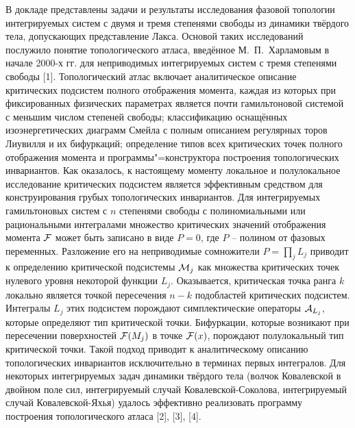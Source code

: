 \vzmscaption


В докладе представлены задачи и результаты исследования фазовой топологии интегрируемых систем с двумя и тремя степенями свободы из динамики твёрдого тела, допускающих представление Лакса. Основой таких исследований послужило понятие топологического атласа, введённое М.~П.~Харламовым в начале 2000-х гг. для неприводимых интегрируемых систем с тремя степенями свободы [1]. Топологический атлас включает аналитическое описание критических подсистем полного отображения момента, каждая из которых при фиксированных физических параметрах является почти гамильтоновой системой с меньшим числом степеней свободы; классификацию оснащённых изоэнергетических диаграмм Смейла с полным описанием регулярных торов Лиувилля и их бифуркаций; определение типов всех критических точек полного отображения момента и программы"=конструктора построения топологических инвариантов. Как оказалось, к настоящему моменту локальное и полулокальное исследование критических подсистем является эффективным средством для конструирования грубых топологических инвариантов. Для интегрируемых гамильтоновых систем с $n$ степенями свободы с полиномиальными или рациональными интегралами множество критических значений отображения момента $\cal F$ может быть записано в виде $P=0$, где $P$ -- полином от фазовых переменных. Разложение его на неприводимые сомножители $P=\prod\nolimits_j {L_j}$ приводит к определению критической подсистемы ${\cal M}_j$ как множества критических точек нулевого уровня некоторой функции $L_j$. Оказывается, критическая точка ранга $k$ локально является точкой пересечения $n-k$ подобластей критических подсистем. Интегралы $L_j$ этих подсистем порождают симплектические операторы ${\cal A}_{L_j}$, которые определяют тип критической точки. Бифуркации, которые возникают при пересечении поверхностей ${\cal F}(M_j)$ в точке
${\cal F}(x)$, порождают полулокальный тип критической точки. Такой подход приводит к аналитическому описанию топологических инвариантов исключительно в терминах первых интегралов. Для некоторых интегрируемых задач динамики твёрдого тела (волчок Ковалевской в двойном поле сил, интегрируемый случай Ковалевской-Соколова, интегрируемый случай Ковалевской-Яхья) удалось эффективно реализовать программу построения топологического атласа [2], [3], [4].

